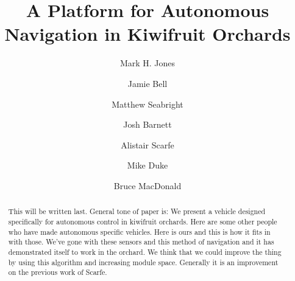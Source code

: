 \documentclass[preprint,authoryear,12pt]{elsarticle}
\begin{document}
\begin{frontmatter}



\title{A Platform for Autonomous Navigation in Kiwifruit Orchards}



\author[UoW]{Mark H. Jones} 

\author[UoA]{Jamie Bell}
\author[UoW]{Matthew Seabright}
\author[UoW]{Josh Barnett}
\author[RPL]{Alistair Scarfe}
\author[UoW]{Mike Duke}
\author[UoA]{Bruce MacDonald}

\address[UoW]{School of Engineering, University of Waikato, Hamilton, New Zealand}
\address[UoA]{Faculty of Engineering, University of Auckland, Auckland, New Zealand}
\address[RPL]{Robotics Plus Ltd, Newnham Innovation Park, Tauranga, New Zealand}

\begin{abstract}

    This will be written last.
    General tone of paper is:
    We present a vehicle designed specifically for autonomous control in kiwifruit orchards.
    Here are some other people who have made autonomous specific vehicles.
    Here is ours and this is how it fits in with those.
    We've gone with these sensors and this method of navigation and it has demonstrated itself to work in the orchard.
    We think that we could improve the thing by using this algorithm and increasing module space.
    Generally it is an improvement on the previous work of Scarfe.
\end{abstract}


\end{frontmatter}
\end{document}
